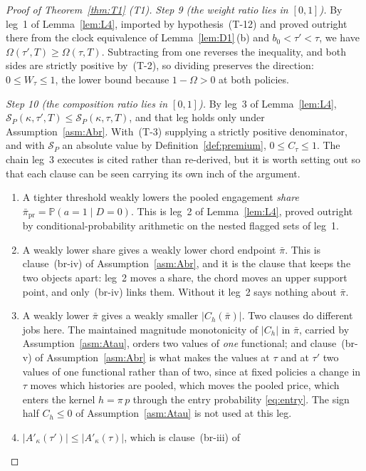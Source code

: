 \documentclass[11pt]{article}
\newcommand{\Prb}{\mathbb{P}}
\newcommand{\Akap}{A'_{\kappa}}
\begin{document}
\begin{proof}[Proof of Theorem~\ref{thm:T1} (T1)]
\emph{Step 9 (the weight ratio lies in $[0,1]$).} By leg~1 of Lemma~\ref{lem:L4}, imported by
hypothesis~(T-12) and proved outright there from the clock equivalence of Lemma~\ref{lem:D1}\,(b)
and $b_0 < \tau' < \tau$, we have $\Omega(\tau',T) \ge \Omega(\tau,T)$. Subtracting from one
reverses the inequality, and both sides are strictly positive by~(T-2), so dividing preserves the
direction: $0 \le W_\tau \le 1$, the lower bound because $1-\Omega > 0$ at both policies.

\emph{Step 10 (the composition ratio lies in $[0,1]$).} By leg~3 of Lemma~\ref{lem:L4},
$\mathcal S_P(\kappa,\tau',T) \le \mathcal S_P(\kappa,\tau,T)$, and that leg holds only under
Assumption~\ref{asm:Abr}. With~(T-3) supplying a strictly positive denominator, and with
$\mathcal S_P$ an absolute value by Definition~\ref{def:premium}, $0 \le C_\tau \le 1$. The chain
leg~3 executes is cited rather than re-derived, but it is worth setting out so that each clause can
be seen carrying its own inch of the argument.
\begin{enumerate}[label=(\roman*),leftmargin=2.4em,itemsep=3pt]
\item A tighter threshold weakly lowers the pooled engagement \emph{share}
  $\bar\pi_{\mathrm{pr}} = \Prb(a=1\mid D=0)$. This is leg~2 of Lemma~\ref{lem:L4}, proved outright
  by conditional-probability arithmetic on the nested flagged sets of leg~1.
\item A weakly lower share gives a weakly lower chord endpoint $\bar\pi$. This is clause~(br-iv) of
  Assumption~\ref{asm:Abr}, and it is the clause that keeps the two objects apart: leg~2 moves a
  share, the chord moves an upper support point, and only~(br-iv) links them. Without it leg~2 says
  nothing about $\bar\pi$.
\item A weakly lower $\bar\pi$ gives a weakly smaller $\lvert C_h(\bar\pi)\rvert$. Two clauses do
  different jobs here. The maintained magnitude monotonicity of $\lvert C_h\rvert$ in $\bar\pi$,
  carried by Assumption~\ref{asm:Atau}, orders two values of \emph{one} functional; and
  clause~(br-v) of Assumption~\ref{asm:Abr} is what makes the values at $\tau$ and at $\tau'$ two
  values of one functional rather than of two, since at fixed policies a change in $\tau$ moves
  which histories are pooled, which moves the pooled price, which enters the kernel
  $h = \pi\,p$ through the entry probability \eqref{eq:entry}. The sign half $C_h \le 0$ of
  Assumption~\ref{asm:Atau} is not used at this leg.
\item $\lvert\Akap(\tau')\rvert \le \lvert\Akap(\tau)\rvert$, which is clause~(br-iii) of

\end{enumerate}
\end{proof}
\end{document}
